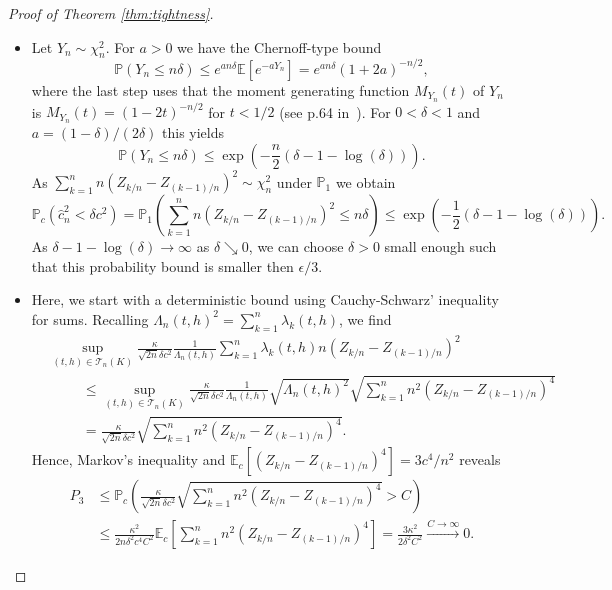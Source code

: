 \documentclass[10.5pt,letter]{article}
\numberwithin{equation}{section}
\theoremstyle{definition}
\newcommand{\E}{\mathbb{E}}
\renewcommand{\P}{\mathbb{P}}
\newcommand{\1}{\mathbbm{1}}
\begin{document}
\begin{proof}[Proof of Theorem \ref{thm:tightness}]
\begin{itemize}
    \item[$\bullet\ \mathbf{P_2}$.] Let $Y_n\sim\chi_n^2$. For $a>0$ we have the  Chernoff-type bound
    \[ \P\left(Y_n\leq n\delta\right) \leq e^{a n\delta}\E\left[ e^{-a Y_n}\right] = e^{a n\delta} (1+2a)^{-n/2},\]
    where the last step uses that the moment generating function $M_{Y_n}(t)$ of $Y_n$ is $M_{Y_n}(t)=(1-2t)^{-n/2}$ for $t<1/2$ (see p.64 in~\cite{Davison}). For $0<\delta<1$ and $a=(1-\delta)/(2\delta)$ this yields
    \[ \P\left(Y_n\leq n\delta\right) \leq \exp\left(-\frac{n}{2}\left(\delta-1-\log(\delta)\right)\right).\]
    As $\sum_{k=1}^n n(Z_{k/n}-Z_{(k-1)/n})^2\sim \chi_n^2$ under $\P_1$ we obtain
    \[ \P_c\left( \hat{c}_n^2 < \delta c^2\right) = \P_1\left( \sum_{k=1}^n n(Z_{k/n}-Z_{(k-1)/n})^2 \leq n\delta\right) \leq \exp\left(-\frac12\left( \delta-1 -\log(\delta)\right)\right).\]
    As $\delta-1-\log(\delta)\rightarrow\infty$ as $\delta\searrow 0$, we can choose $\delta>0$ small enough such that this probability bound is smaller then $\epsilon/3$.

    \item[$\bullet\ \mathbf{P_3}$.] Here, we start with a deterministic bound using Cauchy-Schwarz' inequality for sums. Recalling $\Lambda_n(t,h)^2=\sum_{k=1}^n \lambda_k(t,h)$, we find
    \begin{align*}
        &\sup_{(t,h)\in\mathcal{T}_n(K)}\frac{\kappa}{\sqrt{2n}\delta c^2} \frac{1}{\Lambda_n(t,h)} \sum_{k=1}^n \lambda_k(t,h) n(Z_{k/n}-Z_{(k-1)/n})^2\\
        &\hspace{1cm}\leq \sup_{(t,h)\in\mathcal{T}_n(K)}\frac{\kappa}{\sqrt{2n}\delta c^2} \frac{1}{\Lambda_n(t,h)} \sqrt{\Lambda_n(t,h)^2} \sqrt{\sum_{k=1}^n n^2(Z_{k/n}-Z_{(k-1)/n})^4}\\
        &\hspace{1cm} = \frac{\kappa}{\sqrt{2n}\delta c^2} \sqrt{\sum_{k=1}^n n^2(Z_{k/n}-Z_{(k-1)/n})^4}.
    \end{align*}
    Hence, Markov's inequality and $\E_c[(Z_{k/n}-Z_{(k-1)/n})^4] =3c^4/n^2$ reveals
    \begin{align*}
        P_3 &\leq \P_c\left( \frac{\kappa}{\sqrt{2n}\delta c^2} \sqrt{\sum_{k=1}^n n^2(Z_{k/n}-Z_{(k-1)/n})^4} >C\right) \\
        &\leq \frac{\kappa^2}{2n\delta^2 c^4C^2} \E_c\left[\sum_{k=1}^n n^2(Z_{k/n}-Z_{(k-1)/n})^4 \right] = \frac{3\kappa^2}{2\delta^2 C^2} \stackrel{C\to\infty}{\longrightarrow} 0.
    \end{align*}
\end{itemize}




\end{proof}
\end{document}
